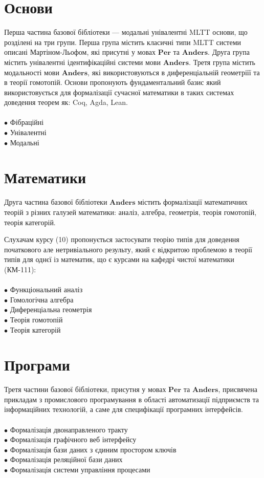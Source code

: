 \documentclass{article}
\theoremstyle{definition}
\begin{document}
\newpage
\section*{Основи}

Перша частина базової бібліотеки --- модальні унівалентні MLTT основи, що розділені на три групи.
Перша група містить класичні типи MLTT системи описані Мартіном-Льофом,
які присутні у мовах $\mathbf{Per}$ та $\mathbf{Anders}$.
Друга група містить унівалентні ідентифікаційні системи мови $\mathbf{Anders}$.
Третя група містить модальності мови $\mathbf{Anders}$, які використовуються в диференціальній геометріїї та в теорії гомотопій.
Основи пропонують фундаментальний базис який використовується
для формалізації сучасної математики в таких системах доведення теорем як: Coq, Agda, Lean.\\
\\
\noindent
$\bullet$ Фібраційні \\
$\bullet$ Унівалентні \\
$\bullet$ Модальні

\section*{Математики}

Друга частина базової бібліотеки $\mathbf{Anders}$ містить формалізації математичних
теорій з різних галузей математики: аналіз, алгебра, геометрія,
теорія гомотопій, теорія категорій.

Слухачам курсу (10) пропонується застосувати теорію типів для
доведення початкового але нетривіального результу, який є
відкритою проблемою в теорії типів для однєї із математик,
що є курсами на кафедрі чистої математики (КМ-111):\\
\\
\noindent
$\bullet$ Функціональний аналіз \\
$\bullet$ Гомологічна алгебра \\
$\bullet$ Диференціальна геометрія \\
$\bullet$ Теорія гомотопій \\
$\bullet$ Теорія категорій \\

\newpage
\section*{Програми}

Третя частини базової бібліотеки, присутня у мовах $\mathbf{Per}$ та $\mathbf{Anders}$,
присвячена прикладам з промислового програмування в області автоматизації
підприємств та інформаційних технологій, а саме для специфікації програмних інтерфейсів.
\\
\\
\noindent $\bullet$ Формалізація двонаправленого тракту \\
$\bullet$ Формалізація графічного веб інтерфейсу \\
$\bullet$ Формалізація бази даних з єдиним простором ключів \\
$\bullet$ Формалізація реляційної бази даних \\
$\bullet$ Формалізація системи управління процесами \\
\end{document}
